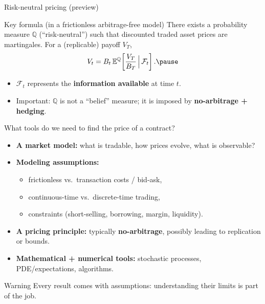\documentclass[10pt,aspectratio=169]{beamer}
\begin{document}
\begin{frame}{Risk-neutral pricing (preview)}
\begin{block}{Key formula (in a frictionless arbitrage-free model)}
There exists a probability measure $\mathbb{Q}$ (``risk-neutral'') such that discounted traded asset prices are martingales.
For a (replicable) payoff $V_T$,
\[
V_t = B_t \, \mathbb{E}^{\mathbb{Q}}\!\left[\frac{V_T}{B_T}\,\Big|\,\mathcal{F}_t\right].\pause
\]
\end{block}

\medskip
\begin{itemize}
  \item $\mathcal{F}_t$ represents the \textbf{information available} at time $t$.\pause 
  \item Important: $\mathbb{Q}$ is not a ``belief'' measure; it is imposed by \textbf{no-arbitrage + hedging}.
\end{itemize}
\end{frame}

\begin{frame}{What tools do we need to find the price of a contract?}
\begin{itemize}
  \item \textbf{A market model:} what is tradable, how prices evolve, what is observable?\pause 
  \item \textbf{Modeling assumptions:}\pause 
  \begin{itemize}
    \item frictionless vs.\ transaction costs / bid-ask,\pause 
    \item continuous-time vs.\ discrete-time trading,\pause 
    \item constraints (short-selling, borrowing, margin, liquidity).\pause 
  \end{itemize}
  \item \textbf{A pricing principle:} typically \textbf{no-arbitrage}, possibly leading to replication or bounds.\pause 
  \item \textbf{Mathematical + numerical tools:} stochastic processes, PDE/expectations, algorithms.\pause 
\end{itemize}

\medskip
\begin{block}{Warning}
Every result comes with assumptions: understanding their limits is part of the job. 
\end{block}

\end{frame}
\end{document}
